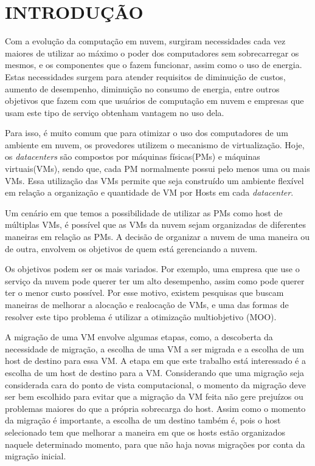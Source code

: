 \chapter{INTRODUÇÃO}
\label{chap:introducao}

Com a evolução da computação em nuvem, surgiram necessidades cada vez maiores de utilizar ao 
máximo o poder dos computadores sem sobrecarregar os mesmos, e os componentes que o fazem funcionar,
assim como o uso de energia. Estas necessidades surgem para atender 
requisitos de diminuição de custos, aumento de desempenho, diminuição no consumo de energia,
entre outros objetivos que fazem com que usuários de computação em nuvem e empresas que usam 
este tipo de serviço obtenham vantagem no uso dela.

Para isso, é muito comum que para otimizar o uso dos computadores de um ambiente em nuvem, 
os provedores utilizem o mecanismo de virtualização. Hoje, os \textit{datacenters} são compostos 
por máquinas físicas(PMs) e máquinas virtuais(VMs), sendo que, cada PM normalmente possui 
pelo menos uma ou mais VMs. Essa utilização das VMs permite que seja construído um ambiente flexível
em relação a organização e quantidade de VM por Hosts em cada \textit{datacenter}.

Um cenário em que temos a possibilidade de utilizar as PMs como host de múltiplas VMs,
é possível que as VMs da nuvem sejam organizadas de diferentes maneiras em relação as PMs. A decisão
de organizar a nuvem de uma maneira ou de outra, envolvem os objetivos de quem está gerenciando a nuvem. 
 
 Os objetivos podem ser os mais variados. Por exemplo, uma empresa que 
 use o serviço da nuvem pode querer ter um alto desempenho, assim como pode querer ter o menor custo 
 possível. Por esse motivo, existem pesquisas que buscam maneiras de melhorar a alocação e realocação de VMs,
 e uma das formas de resolver este tipo problema é utilizar a otimização multiobjetivo (MOO). 

A migração de uma VM envolve algumas etapas, como, a descoberta da necessidade de migração, 
a escolha de uma VM a ser migrada e a escolha de um host de destino para essa VM.
A etapa em que este trabalho está interessado é a escolha de um host de destino para a VM. 
Considerando que uma migração seja considerada cara do ponto de vista computacional, 
o momento da migração deve ser bem escolhido para evitar que a migração da VM feita não gere  
prejuízos ou problemas maiores do que a própria sobrecarga do host. 
Assim como o momento da migração é importante, a escolha de um destino também é, 
pois o host selecionado tem que melhorar a maneira em que os hosts estão organizados naquele determinado momento, 
para que não haja novas migrações por conta da migração inicial.

